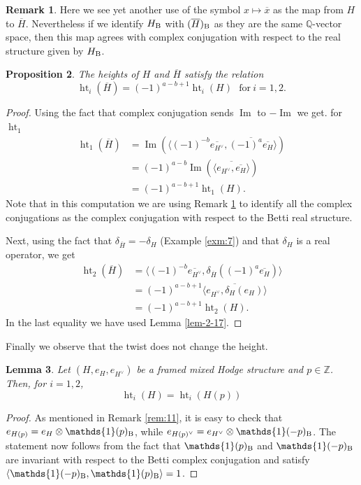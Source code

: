 \documentclass[11pt,a4paper]{amsart}
\newcommand{\Betti}{\text{\rm B}}
\newcommand{\Q}{\mathds{Q}}
\newcommand{\Z}{\mathds{Z}}
\newcommand{\bfone}{{\mathds{1}}}
\DeclareMathOperator{\im}{Im}
\DeclareMathOperator{\Ht}{ht}
\numberwithin{equation}{section}
\theoremstyle{plain}
\newtheorem{prop}{Proposition}[section]
\newtheorem{lem}[prop]{Lemma}
\theoremstyle{definition}
\newtheorem{rmk}[prop]{Remark}
\begin{document}
\begin{rmk}\label{rem:12} Here we see yet another use of the symbol
  $x\mapsto \overline x$ as the map from $H$ to $\overline
  H$. Nevertheless if we identify $H_{\Betti}$ with $(\overline
  H)_{\Betti}$ as they are the same $\Q$-vector space, then this map
  agrees with complex conjugation with respect to the real
  structure  given by $H_{\Betti}$.
\end{rmk}

\begin{prop}\label{conj-ht}
The heights of $H$ and $\overline{H}$ satisfy the relation
\begin{displaymath}
\Ht_{i}(\overline{H})=(-1)^{a-b+1}\Ht_{i}(H)~~~\text{for}~i=1,2.
\end{displaymath}
\end{prop}
\begin{proof}
Using the fact that complex conjugation sends $\im$ to $-\im$ we get.
 for $\Ht_{1}$
\begin{align*}
  \Ht_{1}(\overline{H})&=\im\left(\langle (-1)^{-b}\overline {e_{H^{\vee}}}, \overline{(-1)^{a}\overline{e_{H}}}\rangle\right)\\
&=(-1)^{a-b}\im \left(\overline {\langle e_{H^{\vee}},\overline {e_{H}} \rangle}\right)\\
&=(-1)^{a-b+1}\Ht_{1}(H).
\end{align*}
Note that in this computation we are using Remark \ref{rem:12} to
identify all the complex conjugations as the complex conjugation with
respect to the Betti real structure.

Next, using the fact that $\delta_{\overline{H}}=-\delta_{H}$ (Example
\ref{exm:7}) and that $\delta_{H}$ is a real operator, we get
\begin{align*}
\Ht_{2}(\overline{H})&=\langle (-1)^{-b}\overline {e_{H^{\vee}}},
                       \delta_{\overline H}((-1)^{a}\overline {e_{H}})\rangle\\
&=(-1)^{a-b+1}\overline {\langle e_{H^{\vee}}, \delta_{H}(e_{H})\rangle}\\
&=(-1)^{a-b+1}\Ht_{2}(H).
\end{align*}
In the last equality we have used Lemma \ref{lem-2-17}.
\end{proof}

Finally we observe that the twist does not change the height.

\begin{lem}\label{lem-p}
Let $(H,e_{H}, e_{H^{\vee}})$ be a framed mixed Hodge
  structure and $p\in \Z$. Then, for $i=1,2$,
  \begin{displaymath}
    \Ht_{i}(H)= \Ht_{i}(H(p))
  \end{displaymath}
\end{lem}
\begin{proof}
 As mentioned in Remark \ref{rem:11}, it is easy to check that
 $e_{H(p)}=e_{H}\otimes \bfone(p)_{\Betti}$, while 
 $e_{H(p)^{\vee}}=e_{H^{\vee}}\otimes \bfone(-p)_{\Betti}$. The statement
 now follows from the fact that $\bfone(p)_{\Betti}$ and $\bfone(-p)_{\Betti}$ are invariant
 with respect to the Betti complex conjugation and satisfy $\langle
 \bfone(-p)_{\Betti},\bfone(p)_{\Betti}\rangle =1$.  
\end{proof}
\end{document}
